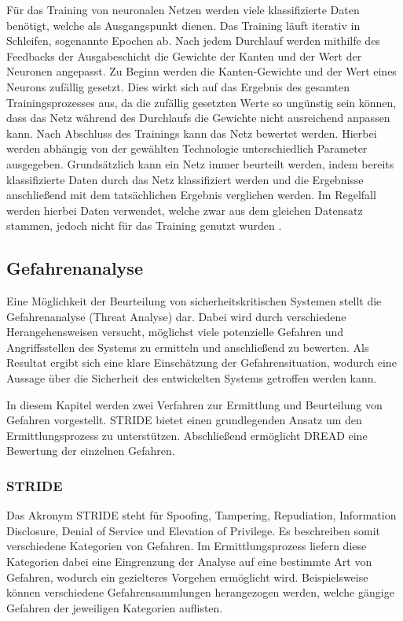 Für das Training von neuronalen Netzen werden viele klassifizierte Daten benötigt, welche als Ausgangspunkt dienen.
Das Training läuft iterativ in Schleifen, sogenannte Epochen ab.
Nach jedem Durchlauf werden mithilfe des Feedbacks der Ausgabeschicht die Gewichte der Kanten und der Wert der Neuronen angepasst.
Zu Beginn werden die Kanten-Gewichte und der Wert eines Neurons zufällig gesetzt.
Dies wirkt sich auf das Ergebnis des gesamten Trainingsprozesses aus, da die zufällig gesetzten Werte so ungünstig sein können, dass das Netz während des Durchlaufs die Gewichte nicht ausreichend anpassen kann.
Nach Abschluss des Trainings kann das Netz bewertet werden.
Hierbei werden abhängig von der gewählten Technologie unterschiedlich Parameter ausgegeben.
Grundsätzlich kann ein Netz immer beurteilt werden, indem bereits klassifizierte Daten durch das Netz klassifiziert werden und die Ergebnisse anschließend mit dem tatsächlichen Ergebnis verglichen werden.
Im Regelfall werden hierbei Daten verwendet, welche zwar aus dem gleichen Datensatz stammen, jedoch nicht für das Training genutzt wurden \autocite[vgl.][]{marcel_mikl_wie_2018}.

\subsection{Gefahrenanalyse}

\textauthor{\vLB}{}{}

Eine Möglichkeit der Beurteilung von sicherheitskritischen Systemen stellt die Gefahrenanalyse (Threat Analyse) dar.
Dabei wird durch verschiedene Herangehensweisen versucht, möglichst viele potenzielle Gefahren und Angriffsstellen des Systems zu ermitteln und anschließend zu bewerten.
Als Resultat ergibt sich eine klare Einschätzung der Gefahrensituation, wodurch eine Aussage über die Sicherheit des entwickelten Systems getroffen werden kann.

In diesem Kapitel werden zwei Verfahren zur Ermittlung und Beurteilung von Gefahren vorgestellt.
STRIDE bietet einen grundlegenden Ansatz um den Ermittlungsprozess zu unterstützen.
Abschließend ermöglicht DREAD eine Bewertung der einzelnen Gefahren.

\subsubsection{STRIDE}\label{sec:stride}
Das Akronym STRIDE steht für Spoofing, Tampering, Repudiation, Information Disclosure, Denial of Service und Elevation of Privilege.
Es beschreiben somit verschiedene Kategorien von Gefahren.
Im Ermittlungsprozess liefern diese Kategorien dabei eine Eingrenzung der Analyse auf eine bestimmte Art von Gefahren, wodurch ein gezielteres Vorgehen ermöglicht wird.
Beispielsweise können verschiedene Gefahrensammlungen herangezogen werden, welche gängige Gefahren der jeweiligen Kategorien auflisten.

